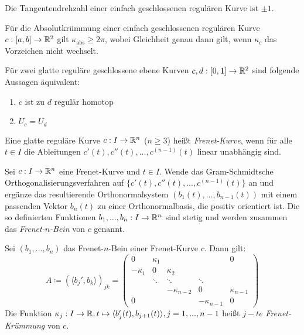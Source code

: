 \documentclass{cheat-sheet}
\begin{document}
\begin{satz}
  Die Tangentendrehzahl einer einfach geschlossenen regulären Kurve ist $\pm 1$.
\end{satz}

\begin{satz}
  Für die Absolutkrümmung einer einfach geschlossenen regulären Kurve $c : [a, b] \to \mathbb{R}^2$ gilt $\kappa_{\text{abs}} \geq 2 \pi$, wobei Gleichheit genau dann gilt, wenn $\kappa_c$ das Vorzeichen nicht wechselt.
\end{satz}

\begin{satz}
  Für zwei glatte reguläre geschlossene ebene Kurven $c, d : [0, 1] \to \mathbb{R}^2$ sind folgende Aussagen äquivalent:
  \begin{multicols}{2}
    \begin{enumerate}[label=(\roman*),leftmargin=2em]
      \item $c$ ist zu $d$ regulär homotop
      \item $U_c = U_d$
    \end{enumerate}
  \end{multicols}
\end{satz}

\begin{defn}
  Eine glatte reguläre Kurve $c : I \to \mathbb{R}^n$ ($n \geq 3$) heißt \emph{Frenet-Kurve}, wenn für alle $t \in I$ die Ableitungen $c'(t), c''(t), ..., c^{(n-1)}(t)$ linear unabhängig sind.
\end{defn}

\begin{defn}
  Sei $c : I \to \mathbb{R}^n$ eine Frenet-Kurve und $t \in I$. Wende das Gram-Schmidtsche Orthogonalisierungsverfahren auf $\{ c'(t), c''(t), ..., c^{(n-1)}(t) \}$ an und ergänze das resultierende Orthonormalsystem $(b_1(t), ..., b_{n-1}(t))$ mit einem passenden Vektor $b_n(t)$ zu einer Orthonormalbasis, die positiv orientiert ist. Die so definierten Funktionen $b_1, ..., b_n : I \to \mathbb{R}^n$ sind stetig und werden zusammen das \emph{Frenet-$n$-Bein} von $c$ genannt.
\end{defn}

\begin{defn}
  Sei $(b_1, ..., b_n)$ das Frenet-$n$-Bein einer Frenet-Kurve $c$. Dann gilt:
  \[ A \coloneqq (\langle b_j' , b_k \rangle)_{jk} = \begin{pmatrix}
    0 & \kappa_1 &&& 0 \\
    - \kappa_1 & 0 & \kappa_2 \\
    & \ddots & \ddots & \ddots \\
    && - \kappa_{n-2} & 0 & \kappa_{n-1} \\
    0 &&& - \kappa_{n-1} & 0
  \end{pmatrix} \]
  Die Funktion $\kappa_j : I \to \mathbb{R}, t \mapsto \langle b_j'(t) , b_{j+1}(t) \rangle, j = 1, ..., n - 1$ heißt $j-te$ \emph{Frenet-Krümmung} von $c$.
\end{defn}
\end{document}

